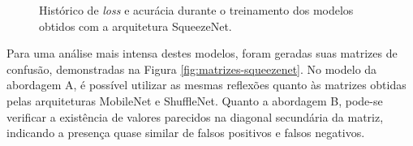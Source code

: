 \begin{figure}[H]
\centering
\caption{Histórico de \emph{loss} e acurácia durante o treinamento dos modelos obtidos com a arquitetura SqueezeNet.}
\label{fig:treinamento-squeezenet}
\hfill
{}
\hfill
{}
\hfill
{}
\end{figure}

Para uma análise mais intensa destes modelos, foram geradas suas matrizes de confusão, demonstradas na Figura \ref{fig:matrizes-squeezenet}. No modelo da abordagem A, é possível utilizar as mesmas reflexões quanto às matrizes obtidas pelas arquiteturas MobileNet e ShuffleNet. Quanto a abordagem B, pode-se verificar a existência de valores parecidos na diagonal secundária da matriz, indicando a presença quase similar de falsos positivos e falsos negativos.
    

